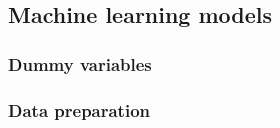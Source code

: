 \documentclass[
]{article}
\newenvironment{Shaded}{\begin{snugshade}}{\end{snugshade}}
\newcommand{\CommentTok}[1]{\textcolor[rgb]{0.56,0.35,0.01}{\textit{#1}}}
\newcommand{\DataTypeTok}[1]{\textcolor[rgb]{0.13,0.29,0.53}{#1}}
\newcommand{\KeywordTok}[1]{\textcolor[rgb]{0.13,0.29,0.53}{\textbf{#1}}}
\newcommand{\NormalTok}[1]{#1}
\newcommand{\OperatorTok}[1]{\textcolor[rgb]{0.81,0.36,0.00}{\textbf{#1}}}
\newcommand{\StringTok}[1]{\textcolor[rgb]{0.31,0.60,0.02}{#1}}
\begin{document}
\hypertarget{machine-learning-models-1}{%
\subsection{Machine learning models}\label{machine-learning-models-1}}

\hypertarget{dummy-variables}{%
\subsubsection{Dummy variables}\label{dummy-variables}}

\label{show-dummy-var}

\begin{Shaded}
\end{Shaded}

\hypertarget{data-preparation-2}{%
\subsubsection{Data preparation}\label{data-preparation-2}}

\label{show-preparation}
\end{document}
